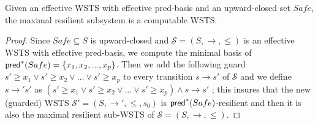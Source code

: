 \begin{theorem}{}
Given an effective WSTS with effective pred-basis and an upward-closed set $Safe$, the maximal resilient subsystem is a computable WSTS.
\end{theorem}

\begin{proof}
Since $Safe \subseteq S$ is upward-closed and $\mathscr{S}=(S, \rightarrow, \leq)$ is an effective WSTS with effective pred-basis, we compute the minimal basis of $\textsf{pred}^*(Safe)=\{x_1,x_2,...,x_p\}$. 
%
%
Then we add the following guard $s' \geq x_1  	\vee s' \geq x_2  	\vee...	\vee s' \geq x_p$ to every transition $s \rightarrow s'$ of $\mathscr{S}$ and we define  $s \rightarrow' s'$ as $(s' \geq x_1  	\vee s' \geq x_2  	\vee...	\vee s' \geq x_p) \wedge s \rightarrow s'$ ; this insures that the new (guarded) WSTS $\mathscr{S'}=(S, \rightarrow', \leq,s_0)$ is $\textsf{pred}^*(Safe)$-resilient and then it is also the maximal resilient sub-WSTS of $\mathscr{S}=(S, \rightarrow, \leq)$.
		\end{proof}
%



